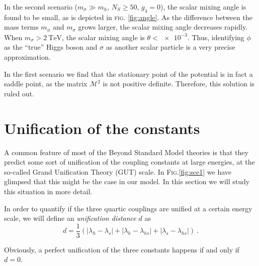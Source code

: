 \documentclass[aps,prd,preprintnumbers,nofootinbibn,twocolumn]{revtex4}
\begin{document}
In the second scenario ($m_\sigma \gg m_h$, $N_S \geq 50$, $g_4=0$), the scalar mixing angle is found to be small, as is depicted in \textsc{fig.} \ref{fig:angle}. As the difference between the mass terms $m_\phi$ and $m_\sigma$ grows larger, the scalar mixing angle decreases rapidly. When $m_\sigma > \SI{2}{\tera\electronvolt}$, the scalar mixing angle is $\theta < \num{e-3}$. Thus, identifying $\phi$ as the ``true'' Higgs boson and $\sigma$ as another scalar particle is a very precise approximation. 

In the first scenario we find that the stationary point of the potential is in fact a saddle point, as the matrix $\mathcal{M}^2$ is not positive definite. Therefore, this solution is ruled out.


\section{Unification of the constants}\label{sec:GUT}

A common feature of most of the Beyond Standard Model theories is that they predict some sort of unification of the coupling constants at large energies, at the so-called Grand Unification Theory (GUT) scale. In \textsc{Fig.}\ref{fig:sce1} we have glimpsed that this might be the case in our model. In this section we will study this situation in more detail.

In order to quantify if the three quartic couplings are unified at a certain energy scale, we will define an \textit{unification distance} $d$ as
\begin{equation}
d = \frac{1}{3}(|\lambda_h - \lambda_s| + |\lambda_h - \lambda_{hs}|+ |\lambda_s - \lambda_{hs}|)\ .
\end{equation}

Obviously, a perfect unification of the three constants happens if and only if $d=0$.
\end{document}
